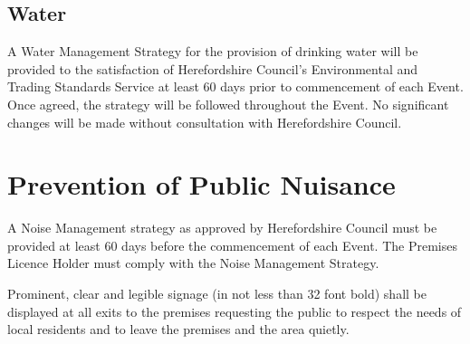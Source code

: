\subsection{Water}\label{water}

A Water Management Strategy for the provision of drinking water will be
provided to the satisfaction of Herefordshire Council's Environmental
and Trading Standards Service at least 60 days prior to commencement of
each Event. Once agreed, the strategy will be followed throughout the
Event. No significant changes will be made without consultation with
Herefordshire Council.

\section{Prevention of Public Nuisance}\label{the-prevention-of-public-nuisance}
A Noise Management strategy as approved by Herefordshire Council must be
provided at least 60 days before the commencement of each Event. The
Premises Licence Holder must comply with the Noise Management Strategy.

Prominent, clear and legible signage (in not less than 32 font bold)
shall be displayed at all exits to the premises requesting the public to
respect the needs of local residents and to leave the premises and the
area quietly.

